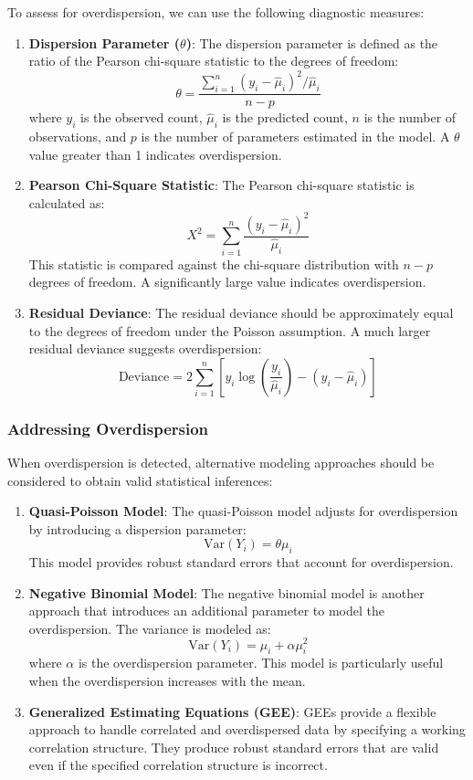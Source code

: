 \documentclass[
]{krantz}
\begin{document}
To assess for overdispersion, we can use the following diagnostic measures:

\begin{enumerate}
\def\labelenumi{\arabic{enumi}.}
\item
  \textbf{Dispersion Parameter (\(\theta\))}:
  The dispersion parameter is defined as the ratio of the Pearson chi-square statistic to the degrees of freedom:
  \[
  \theta = \frac{\sum_{i=1}^{n} (y_i - \hat{\mu}_i)^2 / \hat{\mu}_i}{n - p}
  \]
  where \(y_i\) is the observed count, \(\hat{\mu}_i\) is the predicted count, \(n\) is the number of observations, and \(p\) is the number of parameters estimated in the model. A \(\theta\) value greater than 1 indicates overdispersion.
\item
  \textbf{Pearson Chi-Square Statistic}:
  The Pearson chi-square statistic is calculated as:
  \[
  X^2 = \sum_{i=1}^{n} \frac{(y_i - \hat{\mu}_i)^2}{\hat{\mu}_i}
  \]
  This statistic is compared against the chi-square distribution with \(n - p\) degrees of freedom. A significantly large value indicates overdispersion.
\item
  \textbf{Residual Deviance}:
  The residual deviance should be approximately equal to the degrees of freedom under the Poisson assumption. A much larger residual deviance suggests overdispersion:
  \[
  \text{Deviance} = 2 \sum_{i=1}^{n} \left[ y_i \log\left(\frac{y_i}{\hat{\mu}_i}\right) - (y_i - \hat{\mu}_i) \right]
  \]
\end{enumerate}

\subsubsection{Addressing Overdispersion}\label{addressing-overdispersion}

When overdispersion is detected, alternative modeling approaches should be considered to obtain valid statistical inferences:

\begin{enumerate}
\def\labelenumi{\arabic{enumi}.}
\item
  \textbf{Quasi-Poisson Model}:
  The quasi-Poisson model adjusts for overdispersion by introducing a dispersion parameter:
  \[
  \text{Var}(Y_i) = \theta \mu_i
  \]
  This model provides robust standard errors that account for overdispersion.
\item
  \textbf{Negative Binomial Model}:
  The negative binomial model is another approach that introduces an additional parameter to model the overdispersion. The variance is modeled as:
  \[
  \text{Var}(Y_i) = \mu_i + \alpha \mu_i^2
  \]
  where \(\alpha\) is the overdispersion parameter. This model is particularly useful when the overdispersion increases with the mean.
\item
  \textbf{Generalized Estimating Equations (GEE)}:
  GEEs provide a flexible approach to handle correlated and overdispersed data by specifying a working correlation structure. They produce robust standard errors that are valid even if the specified correlation structure is incorrect.
\end{enumerate}
\end{document}
